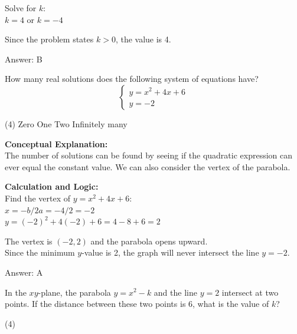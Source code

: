 \documentclass[11pt,paper=a4,answers]{exam}
\begin{document}
\begin{questions}
\begin{solution}
Solve for $k$: \\
$k = 4$ or $k = -4$

\vspace{10pt}

Since the problem states $k > 0$, the value is 4.

\vspace{25pt}

Answer: \colorbox{yellow!100}{B}
\end{solution}

\vspace{40pt}

\question
How many real solutions does the following system of equations have?
\[ \begin{cases} y = x^2 + 4x + 6 \\ y = -2 \end{cases} \]
\begin{tasks}(4)
    \task Zero
    \task One
    \task Two
    \task Infinitely many
\end{tasks}

\begin{solution}
\textbf{Conceptual Explanation:} \\
The number of solutions can be found by seeing if the quadratic expression can ever equal the constant value. We can also consider the vertex of the parabola.

\vspace{20pt}

\textbf{Calculation and Logic:} \\
Find the vertex of $y = x^2 + 4x + 6$: \\
$x = -b/2a = -4/2 = -2$ \\
$y = (-2)^2 + 4(-2) + 6 = 4 - 8 + 6 = 2$

\vspace{10pt}

The vertex is $(-2, 2)$ and the parabola opens upward. \\
Since the minimum $y$-value is 2, the graph will never intersect the line $y = -2$.

\vspace{25pt}

Answer: \colorbox{yellow!100}{A}
\end{solution}

\vspace{40pt}

\question
In the $xy$-plane, the parabola $y = x^2 - k$ and the line $y = 2$ intersect at two points. If the distance between these two points is 6, what is the value of $k$?
\begin{tasks}(4)
\end{tasks}


\end{questions}
\end{document}
